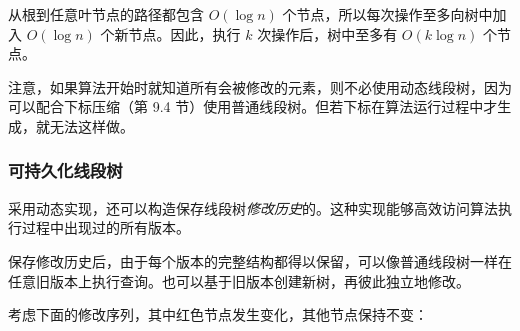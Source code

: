 从根到任意叶节点的路径都包含 $O(\log n)$ 个节点，所以每次操作至多向树中加入 $O(\log n)$ 个新节点。因此，执行 $k$ 次操作后，树中至多有 $O(k \log n)$ 个节点。

注意，如果算法开始时就知道所有会被修改的元素，则不必使用动态线段树，因为可以配合下标压缩（第 9.4 节）使用普通线段树。但若下标在算法运行过程中才生成，就无法这样做。

\subsubsection{可持久化线段树}


采用动态实现，还可以构造保存线段树\emph{修改历史}的。这种实现能够高效访问算法执行过程中出现过的所有版本。

保存修改历史后，由于每个版本的完整结构都得以保留，可以像普通线段树一样在任意旧版本上执行查询。也可以基于旧版本创建新树，再彼此独立地修改。

考虑下面的修改序列，其中红色节点发生变化，其他节点保持不变：

